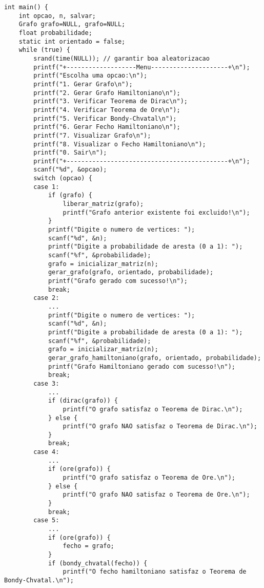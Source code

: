 \documentclass[12pt, openright, oneside, a4paper, chapter=TITLE, section=TITLE, subsection=TITLE, subsubsection=TITLE, brazil]{abntex2}
\newenvironment{codebox}%
  {\begin{mdframed}[backgroundcolor=gray!5, linecolor=gray, roundcorner=5pt]}%
  {\end{mdframed}}
\begin{document}
\begin{codebox}
\begin{verbatim}
int main() {
    int opcao, n, salvar;
    Grafo grafo=NULL, grafo=NULL;
    float probabilidade;
    static int orientado = false;
    while (true) {
        srand(time(NULL)); // garantir boa aleatorizacao
        printf("+-------------------Menu---------------------+\n");
        printf("Escolha uma opcao:\n");
        printf("1. Gerar Grafo\n");
        printf("2. Gerar Grafo Hamiltoniano\n");
        printf("3. Verificar Teorema de Dirac\n");
        printf("4. Verificar Teorema de Ore\n");
        printf("5. Verificar Bondy-Chvatal\n");
        printf("6. Gerar Fecho Hamiltoniano\n");
        printf("7. Visualizar Grafo\n");
        printf("8. Visualizar o Fecho Hamiltoniano\n");
        printf("0. Sair\n");
        printf("+--------------------------------------------+\n");
        scanf("%d", &opcao);
        switch (opcao) {
        case 1:
            if (grafo) {
                liberar_matriz(grafo);
                printf("Grafo anterior existente foi excluido!\n");
            }
            printf("Digite o numero de vertices: ");
            scanf("%d", &n);
            printf("Digite a probabilidade de aresta (0 a 1): ");
            scanf("%f", &probabilidade);
            grafo = inicializar_matriz(n);
            gerar_grafo(grafo, orientado, probabilidade);
            printf("Grafo gerado com sucesso!\n");
            break;
        case 2:
            ...
            printf("Digite o numero de vertices: ");
            scanf("%d", &n);
            printf("Digite a probabilidade de aresta (0 a 1): ");
            scanf("%f", &probabilidade);
            grafo = inicializar_matriz(n);
            gerar_grafo_hamiltoniano(grafo, orientado, probabilidade);
            printf("Grafo Hamiltoniano gerado com sucesso!\n");
            break;
        case 3:
            ...
            if (dirac(grafo)) {
                printf("O grafo satisfaz o Teorema de Dirac.\n");
            } else {
                printf("O grafo NAO satisfaz o Teorema de Dirac.\n");
            }
            break;
        case 4:
            ...
            if (ore(grafo)) {
                printf("O grafo satisfaz o Teorema de Ore.\n");
            } else {
                printf("O grafo NAO satisfaz o Teorema de Ore.\n");
            }
            break;
        case 5:
            ...
            if (ore(grafo)) {
                fecho = grafo;
            }
            if (bondy_chvatal(fecho)) {
                printf("O fecho hamiltoniano satisfaz o Teorema de Bondy-Chvatal.\n");

\end{verbatim}
\end{codebox}
\end{document}
